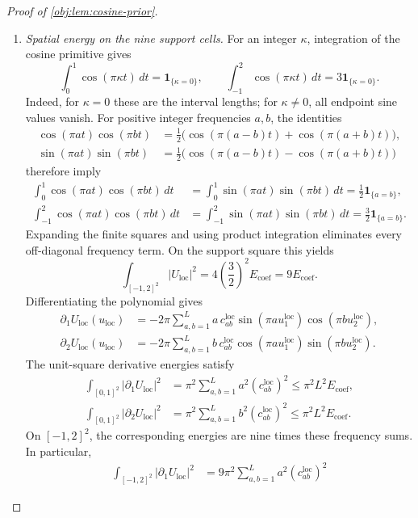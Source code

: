 \documentclass[11pt]{article}
\begin{document}
\begin{proof}[Proof of \cref{obj:lem:cosine-prior}]
\begin{enumerate}
\item \emph{Spatial energy on the nine support cells.}
For an integer \(\kappa\), integration of the cosine primitive gives
\[
\int_0^1\cos(\pi\kappa t)\,dt
=\mathbf1_{\{\kappa=0\}},
\qquad
\int_{-1}^2\cos(\pi\kappa t)\,dt
=3\mathbf1_{\{\kappa=0\}}.
\]
Indeed, for \(\kappa=0\) these are the interval lengths; for
\(\kappa\ne0\), all endpoint sine values vanish. For positive integer
frequencies \(a,b\), the identities
\[
\begin{aligned}
\cos(\pi a t)\cos(\pi b t)
&=\frac12\bigl(\cos(\pi(a-b)t)+\cos(\pi(a+b)t)\bigr),\\
\sin(\pi a t)\sin(\pi b t)
&=\frac12\bigl(\cos(\pi(a-b)t)-\cos(\pi(a+b)t)\bigr)
\end{aligned}
\]
therefore imply
\[
\begin{aligned}
\int_0^1\cos(\pi a t)\cos(\pi b t)\,dt
&=\int_0^1\sin(\pi a t)\sin(\pi b t)\,dt
 =\frac12\mathbf1_{\{a=b\}},\\
\int_{-1}^2\cos(\pi a t)\cos(\pi b t)\,dt
&=\int_{-1}^2\sin(\pi a t)\sin(\pi b t)\,dt
 =\frac32\mathbf1_{\{a=b\}}.
\end{aligned}
\]
Expanding the finite squares and using product integration eliminates
every off-diagonal frequency term. On the support square this yields
\[
\int_{[-1,2]^2}|U_{\mathrm{loc}}|^2
=4\left(\frac32\right)^2 E_{\mathrm{coef}}
=9E_{\mathrm{coef}}.
\]
Differentiating the polynomial gives
\[
\begin{aligned}
\partial_1U_{\mathrm{loc}}(u_{\mathrm{loc}})
&=-2\pi\sum_{a,b=1}^L
 a\,c^{\mathrm{loc}}_{ab}
 \sin(\pi a u_1^{\mathrm{loc}})
 \cos(\pi b u_2^{\mathrm{loc}}),\\
\partial_2U_{\mathrm{loc}}(u_{\mathrm{loc}})
&=-2\pi\sum_{a,b=1}^L
 b\,c^{\mathrm{loc}}_{ab}
 \cos(\pi a u_1^{\mathrm{loc}})
 \sin(\pi b u_2^{\mathrm{loc}}).
\end{aligned}
\]
The unit-square derivative energies satisfy
\[
\begin{aligned}
\int_{[0,1]^2}|\partial_1U_{\mathrm{loc}}|^2
&=\pi^2\sum_{a,b=1}^L a^2(c^{\mathrm{loc}}_{ab})^2
 \leq\pi^2L^2E_{\mathrm{coef}},\\
\int_{[0,1]^2}|\partial_2U_{\mathrm{loc}}|^2
&=\pi^2\sum_{a,b=1}^L b^2(c^{\mathrm{loc}}_{ab})^2
 \leq\pi^2L^2E_{\mathrm{coef}}.
\end{aligned}
\]
On \([-1,2]^2\), the corresponding energies are nine times these
frequency sums. In particular,
\[
\begin{aligned}
\int_{[-1,2]^2}|\partial_1U_{\mathrm{loc}}|^2
&=9\pi^2\sum_{a,b=1}^L a^2(c^{\mathrm{loc}}_{ab})^2

\end{aligned}\]
\end{enumerate}
\end{proof}
\end{document}
